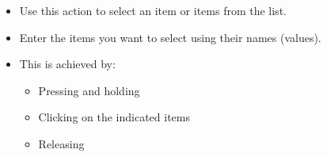 \begin{itemize}
\item Use this action to select an item or items from the list. 
\item Enter the items you want to select using their names (values).
\item This is achieved by:
\begin{itemize}
\item Pressing and holding 
\item Clicking on the indicated items
\item Releasing 
\end{itemize}
\end{itemize}
